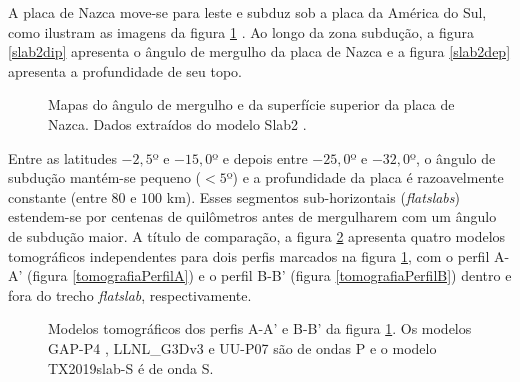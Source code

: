 A placa de Nazca move-se para leste e subduz sob a placa da América do Sul, como ilustram as imagens da figura \ref{slab2} \citep[modelo Slab2,][]{hayes2018slab2}. Ao longo da zona subdução, a figura \ref{slab2dip} apresenta o ângulo de mergulho da placa de Nazca e a figura \ref{slab2dep} apresenta a profundidade de seu topo.

\begin{figure}
  \centering


  \vspace{0.5cm}

    
  \caption{Mapas do ângulo de mergulho e da superfície superior da placa de Nazca. Dados extraídos do modelo Slab2 \citep{hayes2018slab2}.}
  \label{slab2}
    
\end{figure}

Entre as latitudes $-2,5$º e $-15,0$º e depois entre $-25,0$º e $-32,0$º, o ângulo de subdução mantém-se pequeno ($<5$º) e a profundidade da placa é razoavelmente constante (entre $80$ e $100$ km). Esses segmentos sub-horizontais (\textit{flatslabs}) estendem-se por centenas de quilômetros antes de mergulharem com um ângulo de subdução maior. A título de comparação, a figura \ref{tomografias} apresenta quatro modelos tomográficos independentes \citep{obayashi2013pwavetomography,fukao2013subductedslabs,simmons2012pwavetomography,amaru2007global,lu2019seismictomography} para dois perfis marcados na figura \ref{slab2}, com o perfil A-A' (figura \ref{tomografiaPerfilA}) e o perfil B-B' (figura \ref{tomografiaPerfilB}) dentro e fora do trecho \textit{flatslab}, respectivamente. 

\begin{figure}
  \centering

  \hspace{0.5cm}
    
  \caption{Modelos tomográficos dos perfis A-A' e B-B' da figura \ref{slab2}. Os modelos GAP-P4 \citep{obayashi2013pwavetomography,fukao2013subductedslabs}, LLNL\_G3Dv3 \citep{simmons2012pwavetomography} e UU-P07 \citep{amaru2007global} são de ondas P e o modelo TX2019slab-S \citep{lu2019seismictomography} é de onda S.}
  \label{tomografias}
\end{figure}

